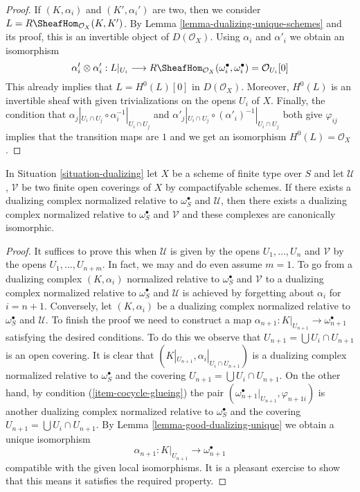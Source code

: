\begin{proof}
If $(K, \alpha_i)$ and $(K', \alpha_i')$ are two, then we consider
$L = R\SheafHom_{\mathcal{O}_X}(K, K')$.
By Lemma \ref{lemma-dualizing-unique-schemes}
and its proof, this is an invertible object of $D(\mathcal{O}_X)$.
Using $\alpha_i$ and $\alpha'_i$ we obtain an isomorphism
$$
\alpha_i^t \otimes \alpha'_i :
L|_{U_i} \longrightarrow
R\SheafHom_{\mathcal{O}_X}(\omega_i^\bullet, \omega_i^\bullet) =
\mathcal{O}_{U_i}[0]
$$
This already implies that $L = H^0(L)[0]$ in $D(\mathcal{O}_X)$.
Moreover, $H^0(L)$ is an invertible sheaf with given trivializations
on the opens $U_i$ of $X$. Finally, the condition that
$\alpha_j|_{U_i \cap U_j} \circ \alpha_i^{-1}|_{U_i \cap U_j}$
and
$\alpha'_j|_{U_i \cap U_j} \circ (\alpha'_i)^{-1}|_{U_i \cap U_j}$
both give $\varphi_{ij}$ implies that the transition maps
are $1$ and we get an isomorphism $H^0(L) = \mathcal{O}_X$.
\end{proof}

\begin{lemma}
\label{lemma-good-dualizing-independence-covering}
In Situation \ref{situation-dualizing} let $X$ be a scheme of finite type
over $S$ and let $\mathcal{U}$, $\mathcal{V}$ be two finite open coverings
of $X$ by compactifyable schemes.
If there exists a dualizing complex normalized
relative to $\omega_S^\bullet$ and $\mathcal{U}$, then
there exists a dualizing complex normalized relative to
$\omega_S^\bullet$ and $\mathcal{V}$ and these complexes are
canonically isomorphic.
\end{lemma}

\begin{proof}
It suffices to prove this when $\mathcal{U}$ is given by the opens
$U_1, \ldots, U_n$ and $\mathcal{V}$ by the opens $U_1, \ldots, U_{n + m}$.
In fact, we may and do even assume $m = 1$.
To go from a dualizing complex $(K, \alpha_i)$ normalized
relative to $\omega_S^\bullet$ and $\mathcal{V}$ to a
dualizing complex normalized relative to $\omega_S^\bullet$ and $\mathcal{U}$
is achieved by forgetting about $\alpha_i$ for $i = n + 1$. Conversely, let
$(K, \alpha_i)$ be a dualizing complex normalized relative to
$\omega_S^\bullet$ and $\mathcal{U}$.
To finish the proof we need to construct a map
$\alpha_{n + 1} : K|_{U_{n + 1}} \to \omega_{n + 1}^\bullet$ satisfying
the desired conditions.
To do this we observe that $U_{n + 1} = \bigcup U_i \cap U_{n + 1}$
is an open covering.
It is clear that $(K|_{U_{n + 1}}, \alpha_i|_{U_i \cap U_{n + 1}})$
is a dualizing complex normalized relative to $\omega_S^\bullet$
and the covering $U_{n + 1} = \bigcup U_i \cap U_{n + 1}$.
On the other hand, by condition (\ref{item-cocycle-glueing}) the pair
$(\omega_{n + 1}^\bullet|_{U_{n + 1}}, \varphi_{n + 1i})$
is another dualizing complex normalized relative to $\omega_S^\bullet$
and the covering
$U_{n + 1} = \bigcup U_i \cap U_{n + 1}$.
By Lemma \ref{lemma-good-dualizing-unique} we obtain a unique isomorphism
$$
\alpha_{n + 1} : K|_{U_{n + 1}} \longrightarrow \omega_{n + 1}^\bullet
$$
compatible with the given local isomorphisms.
It is a pleasant exercise to show that this means it satisfies
the required property.
\end{proof}

